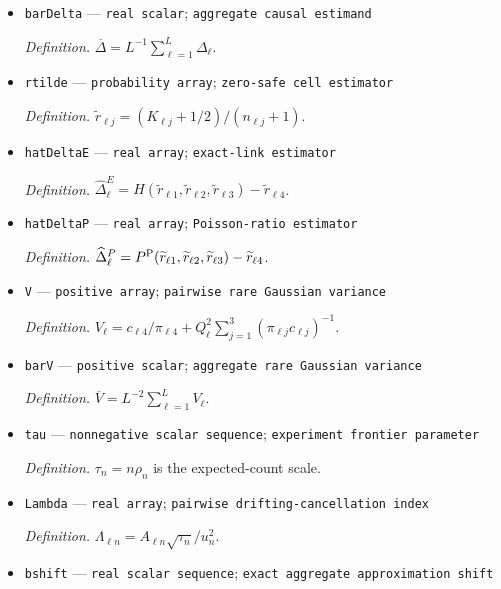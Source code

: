 \documentclass{article}
\begin{document}
\begin{itemize}
  \par\smallskip\noindent\emph{Definition.} \(\Delta^P_{\ell}=P^{\rm P}(r_{\ell1},r_{\ell2},r_{\ell3})-r_{\ell4}=\rho(Q_{\ell}-c_{\ell4})\).
  \item \texttt{barDelta} --- \texttt{real scalar}; \texttt{aggregate causal estimand}
  \par\smallskip\noindent\emph{Definition.} \(\overline\Delta=L^{-1}\sum_{\ell=1}^{L}\Delta_{\ell}\).
  \item \texttt{rtilde} --- \texttt{probability array}; \texttt{zero-\allowbreak{}safe cell estimator}
  \par\smallskip\noindent\emph{Definition.} \(\widetilde r_{\ell j}=(K_{\ell j}+1/2)/(n_{\ell j}+1)\).
  \item \texttt{hatDeltaE} --- \texttt{real array}; \texttt{exact-\allowbreak{}link estimator}
  \par\smallskip\noindent\emph{Definition.} \(\widehat\Delta^E_{\ell}=H(\widetilde r_{\ell1},\widetilde r_{\ell2},\widetilde r_{\ell3})-\widetilde r_{\ell4}\).
  \item \texttt{hatDeltaP} --- \texttt{real array}; \texttt{Poisson-\allowbreak{}ratio estimator}
  \par\smallskip\noindent\emph{Definition.} \(\widehat\Delta^P_{\ell}=P^{\rm P}(\widetilde r_{\ell1},\widetilde r_{\ell2},\widetilde r_{\ell3})-\widetilde r_{\ell4}\).
  \item \texttt{V} --- \texttt{positive array}; \texttt{pairwise rare Gaussian variance}
  \par\smallskip\noindent\emph{Definition.} \(V_{\ell}=c_{\ell4}/\pi_{\ell4}+Q_{\ell}^{2}\sum_{j=1}^{3}(\pi_{\ell j}c_{\ell j})^{-1}\).
  \item \texttt{barV} --- \texttt{positive scalar}; \texttt{aggregate rare Gaussian variance}
  \par\smallskip\noindent\emph{Definition.} \(\overline V=L^{-2}\sum_{\ell=1}^{L}V_{\ell}\).
  \item \texttt{tau} --- \texttt{nonnegative scalar sequence}; \texttt{experiment frontier parameter}
  \par\smallskip\noindent\emph{Definition.} \(\tau_n=n\rho_n\) is the expected-count scale.
  \item \texttt{Lambda} --- \texttt{real array}; \texttt{pairwise drifting-\allowbreak{}cancellation index}
  \par\smallskip\noindent\emph{Definition.} \(\Lambda_{\ell n}=A_{\ell n}\sqrt{\tau_n}/u_n^2\).
  \item \texttt{bshift} --- \texttt{real scalar sequence}; \texttt{exact aggregate approximation shift}

\end{itemize}
\end{document}
